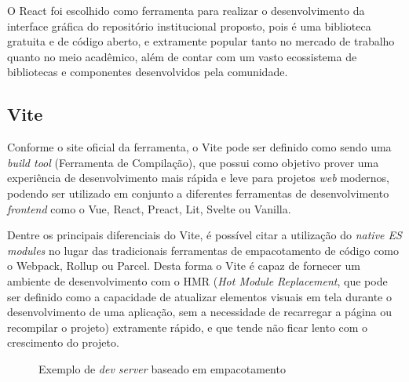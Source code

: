 O React foi escolhido como ferramenta para realizar o desenvolvimento da
interface gráfica do repositório institucional proposto, pois é uma biblioteca
gratuita e de código aberto, e extramente popular tanto no mercado de trabalho
quanto no meio acadêmico, além de contar com um vasto ecossistema de bibliotecas
e componentes desenvolvidos pela comunidade.

\subsection{Vite}

Conforme \cite{Vite:2022} o site oficial da ferramenta, o Vite pode ser definido
como sendo uma \emph{build tool} (Ferramenta de Compilação), que possui como objetivo
prover uma experiência de desenvolvimento mais rápida e leve para projetos
\emph{web} modernos, podendo ser utilizado em conjunto a diferentes ferramentas de
desenvolvimento \emph{frontend} como o Vue, React, Preact, Lit, Svelte ou Vanilla.

Dentre os principais diferenciais do Vite, é possível citar a utilização do
\emph{native ES modules} no lugar das tradicionais ferramentas de empacotamento
de código como o Webpack, Rollup ou Parcel. Desta forma o Vite é capaz de
fornecer um ambiente de desenvolvimento com o HMR (\emph{Hot Module Replacement},
que pode ser definido como a capacidade de atualizar elementos visuais em tela
durante o desenvolvimento de uma aplicação, sem a necessidade de recarregar a
página ou recompilar o projeto) extramente rápido, e que tende não ficar lento
com o crescimento do projeto.

\begin{figure}[H]
    \caption{Exemplo de \emph{dev server} baseado em empacotamento}
    \centering
    \label{fig:bundle-based}
\end{figure}

